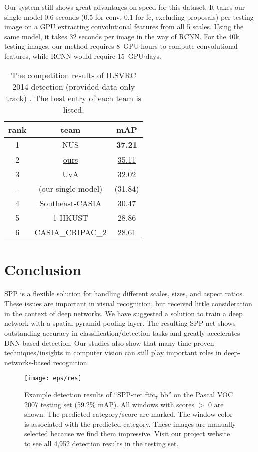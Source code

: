 \documentclass[10pt,journal,cspaper,compsoc]{IEEEtran}
\begin{document}
Our system still shows great advantages on speed for this dataset. It takes our single model 0.6 seconds (0.5 for conv, 0.1 for fc, excluding proposals) per testing image on a GPU extracting convolutional features from all 5 scales. Using the same model, it takes 32 seconds per image in the way of RCNN. For the 40k testing images, our method requires 8~GPU$\cdot$hours to compute convolutional features, while RCNN would require 15~GPU$\cdot$days.

\setlength{\tabcolsep}{8pt}
\begin{table}[t]
\footnotesize
\begin{center}
\begin{tabular}{cc|c}
\hline
rank & team & mAP\\
\hline
1 &  NUS & \textbf{37.21}\\
2 & \underline{ours} & \underline{35.11}\\
3 & UvA & 32.02\\
- & (our single-model) & (31.84)\\
4 & Southeast-CASIA & 30.47\\
5 & 1-HKUST & 28.86\\
6 & CASIA\_CRIPAC\_2 & 28.61\\
\hline
\end{tabular}
\caption{The competition results of ILSVRC 2014 detection (provided-data-only track) \cite{Russakovsky2014}. The best entry of each team is listed.}
\label{tab:ilsvrc14_DET}
\end{center}
\end{table}

\renewcommand{\baselinestretch}{0.8}
\section{Conclusion}

SPP is a flexible solution for handling different scales, sizes, and aspect ratios. These issues are important in visual recognition, but received little consideration in the context of deep networks. We have suggested a solution to train a deep network with a spatial pyramid pooling layer. The resulting SPP-net shows outstanding accuracy in classification/detection tasks and greatly accelerates DNN-based detection. Our studies also show that many time-proven techniques/insights in computer vision can still play important roles in deep-networks-based recognition.

\begin{figure*}[t]
\center
\texttt{[image: eps/res]}
\caption{Example detection results of ``SPP-net ftfc$_7$ bb'' on the Pascal VOC 2007 testing set (59.2\% mAP). All windows with scores $>$ 0 are shown. The predicted category/score are marked. The window color is associated with the predicted category. These images are manually selected because we find them impressive. Visit our project website to see all 4,952 detection results in the testing set.}
\label{fig:res}
\end{figure*}
\end{document}
